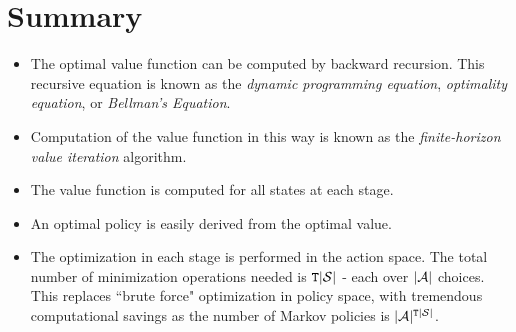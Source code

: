 \section{Summary}
\begin{itemize}
  \item The optimal value function can be computed by backward recursion. This recursive equation is known as the \emph{dynamic programming equation}, \emph{optimality equation}, or \emph{Bellman's Equation}.
  \item Computation of the value function in this way is known as the \emph{finite-horizon value iteration} algorithm.
  \item The value function is computed for all states at each stage.
  \item An optimal policy is easily derived from the optimal value.
  \item The optimization in each stage is performed in the action space.  The total number of minimization operations needed is ${\tt T}  |\mathcal{S}|$  - each over $|\mathcal{A}|$ choices. This replaces ``brute force" optimization in policy space, with tremendous computational savings as the number of Markov policies is $|\mathcal{A}{|^{{\tt T} |\mathcal{S}|}}$.
\end{itemize}

